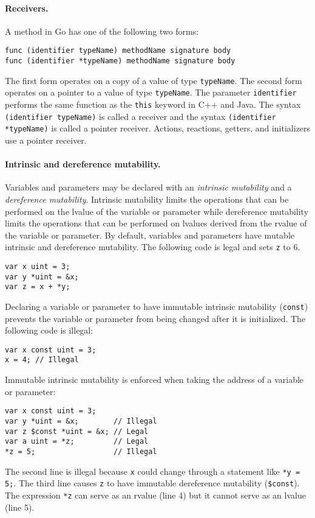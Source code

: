\paragraph{Receivers.}
A method in Go has one of the following two forms:
\begin{verbatim}
func (identifier typeName) methodName signature body
func (identifier *typeName) methodName signature body
\end{verbatim}
The first form operates on a copy of a value of type \verb+typeName+.
The second form operates on a pointer to a value of type \verb+typeName+.
The parameter \verb+identifier+ performs the same function as the \verb+this+ keyword in C++ and Java.
The syntax \verb+(identifier typeName)+ is called a receiver and the syntax \verb+(identifier *typeName)+ is called a pointer receiver.
Actions, reactions, getters, and initializers use a pointer receiver.

\paragraph{Intrinsic and dereference mutability.}
Variables and parameters may be declared with an \emph{intrinsic mutability} and a \emph{dereference mutability}.
Intrinsic mutability limits the operations that can be performed on the lvalue of the variable or parameter while dereference mutability limits the operations that can be performed on lvalues derived from the rvalue of the variable or parameter.
By default, variables and parameters have mutable intrinsic and dereference mutability.
The following code is legal and sets \verb+z+ to 6.
\begin{verbatim}
var x uint = 3;
var y *uint = &x;
var z = x + *y;
\end{verbatim}

Declaring a variable or parameter to have immutable intrinsic mutability (\verb+const+) prevents the variable or parameter from being changed after it is initialized.
The following code is illegal:
\begin{verbatim}
var x const uint = 3;
x = 4; // Illegal
\end{verbatim}
Immutable intrinsic mutability is enforced when taking the address of a variable or parameter:
\begin{verbatim}
var x const uint = 3;
var y *uint = &x;        // Illegal
var z $const *uint = &x; // Legal
var a uint = *z;         // Legal
*z = 5;                  // Illegal
\end{verbatim}
The second line is illegal because \verb+x+ could change through a statement like \verb+*y = 5;+.
The third line causes \verb+z+ to have immutable dereference mutability (\verb|$const|).
The expression \verb+*z+ can serve as an rvalue (line 4) but it cannot serve as an lvalue (line 5).

